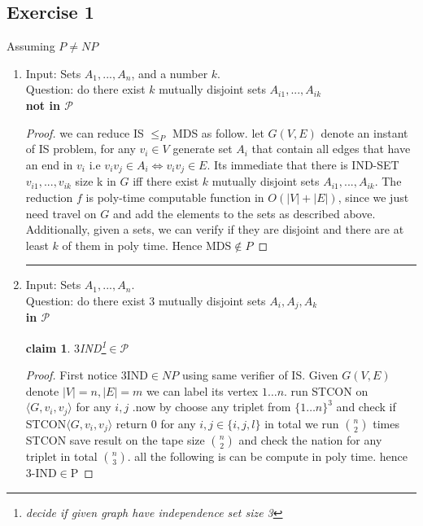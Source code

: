 \documentclass[12pt]{article}
\newtheorem*{claim*}{claim}
\begin{document}
\subsection{Exercise 1} 
Assuming $P\ne NP$
\begin{enumerate}[label=(\alph*)]
\item Input:  Sets $A_1, ..., A_n$, and a number $k$.\\ Question: do there exist $k$ mutually disjoint sets $A_{i1}
, ..., A_{ik}$\\
\textbf{ not in  $\mathcal{P}$}
\begin{proof}
we can reduce IS $ \le_P$ MDS as follow.  let $G(V,E)$ denote an instant of IS problem, for any $v_i\in V$ generate set $A_i$ that contain all edges that have an end in $v_i$  i.e $v_iv_j \in A_i \Leftrightarrow v_iv_j  \in E $. Its immediate that there is IND-SET  $v_{i1}
, ..., v_{ik}$ size k in $G$ iff  there exist $k$ mutually disjoint sets $A_{i1}, ..., A_{ik}$. The reduction $f$ is  poly-time computable function in  $O(|V|+|E|)$, since we just need travel on $G$ and add the elements  to the sets as described above. Additionally, given a 
sets, we can verify if they are disjoint and there are at least $k$ of them in poly
time. Hence MDS$\notin P$
\end{proof}
\hrule
\item Input:  Sets $A_1, ..., A_n$.\\ Question: do there exist 3 mutually disjoint sets $A_{i}
,A_{j}, A_{k}$\\
\textbf{ in  $\mathcal{P}$}
 
\begin{claim*} $3$IND\footnote{decide if given graph have independence set size 3}$\in \mathcal{P}$ 
\end{claim*}
\begin{proof}First notice 3IND$\in NP$ using same verifier of IS.
Given $G(V,E)$ denote $|V|=n,|E|=m$ we can label its vertex $1\dots n$. run STCON on $\langle G,v_i,v_j \rangle$ for any $i,j$
.now by choose  any triplet from $\{1\dots n\}^3$ and check if  STCON$\langle G,v_i,v_j \rangle$ return 0 for any $i,j\in \{i,j,l\}$ in total we run  $n \choose 2 $ times STCON save result on the tape size   $n \choose 2 $ and check the nation for any triplet in total $n \choose 3$. all the following is can be compute in poly time. hence 3-IND$ \in $P   


\end{proof}
\end{enumerate}
\end{document}
